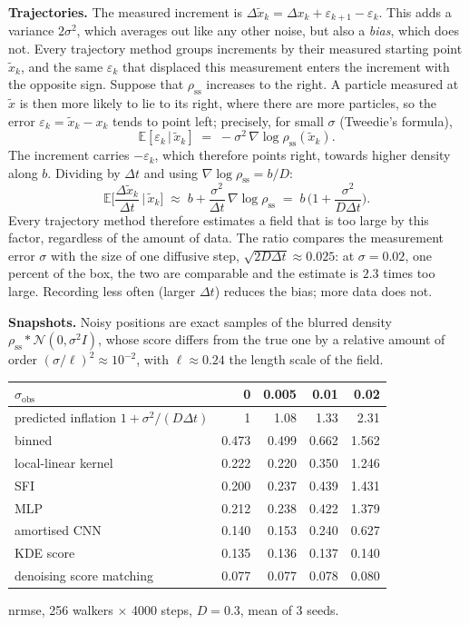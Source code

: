 \documentclass[11pt,a4paper]{article}
\newcommand{\dt}{\Delta t}
\newcommand{\dx}{\Delta x}
\newcommand{\E}{\mathbb{E}}
\newcommand{\rss}{\rho_{\mathrm{ss}}}
\begin{document}
\textbf{Trajectories.} The measured increment is
$\Delta\tilde x_k = \dx_k + \varepsilon_{k+1} - \varepsilon_k$. This adds a variance
$2\sigma^2$, which averages out like any other noise, but also a \emph{bias}, which does not.
Every trajectory method groups increments by their measured starting point $\tilde x_k$, and
the same $\varepsilon_k$ that displaced this measurement enters the increment with the
opposite sign. Suppose that $\rss$ increases to the right. A particle measured at $\tilde x$
is then more likely to lie to its right, where there are more particles, so the error
$\varepsilon_k=\tilde x_k-x_k$ tends to point left; precisely, for small $\sigma$ (Tweedie's
formula),
\begin{equation}
  \E[\varepsilon_k \,|\, \tilde x_k] \;=\; -\sigma^2\,\nabla\log\rss(\tilde x_k).
\end{equation}
The increment carries $-\varepsilon_k$, which therefore points right, towards higher density
\textemdash{} along $b$. Dividing by $\dt$ and using $\nabla\log\rss=b/D$:
\begin{equation}
  \E\Big[\frac{\Delta\tilde x_k}{\dt}\,\Big|\,\tilde x_k\Big]
  \;\approx\; b + \frac{\sigma^2}{\dt}\,\nabla\log\rss
  \;=\; b\,\Big(1+\frac{\sigma^2}{D\dt}\Big).
\end{equation}
Every trajectory method therefore estimates a field that is too large by this factor,
regardless of the amount of data. The ratio compares the measurement error $\sigma$ with the
size of one diffusive step, $\sqrt{2D\dt}\approx0.025$: at $\sigma=0.02$, one percent of the
box, the two are comparable and the estimate is $2.3$ times too large. Recording less often
(larger $\dt$) reduces the bias; more data does not.

\textbf{Snapshots.} Noisy positions are exact samples of the blurred density
$\rss*\mathcal N(0,\sigma^2I)$, whose score differs from the true one by a relative amount of
order $(\sigma/\ell)^2\approx10^{-2}$, with $\ell\approx0.24$ the length scale of the field.

\begin{center}
\small
\begin{tabular}{@{}lrrrr@{}}
\toprule
$\sigma_{\mathrm{obs}}$ & 0 & 0.005 & 0.01 & 0.02 \\
\midrule
predicted inflation $1+\sigma^2/(D\dt)$ & 1 & 1.08 & 1.33 & 2.31 \\
\midrule
binned & 0.473 & 0.499 & 0.662 & 1.562 \\
local-linear kernel & 0.222 & 0.220 & 0.350 & 1.246 \\
SFI & 0.200 & 0.237 & 0.439 & 1.431 \\
MLP & 0.212 & 0.238 & 0.422 & 1.379 \\
amortised CNN & 0.140 & 0.153 & 0.240 & 0.627 \\
\midrule
KDE score & 0.135 & 0.136 & 0.137 & 0.140 \\
denoising score matching & 0.077 & 0.077 & 0.078 & 0.080 \\
\bottomrule
\end{tabular}
\end{center}
{\footnotesize\color{ink2} nrmse, 256 walkers $\times$ 4000 steps, $D=0.3$, mean of 3 seeds.}
\end{document}
